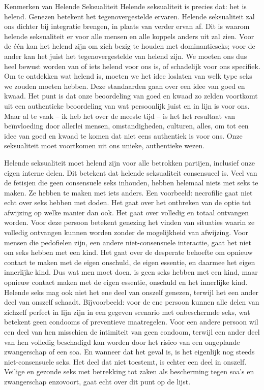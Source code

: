 Kenmerken van Helende Seksualiteit
Helende seksualiteit is precies dat: het is helend. Genezen betekent het tegenovergestelde ervaren. Helende seksualiteit zal ons dichter bij integratie brengen, in plaats van verder ervan af. Dit is waarom helende seksualiteit er voor alle mensen en alle koppels anders uit zal zien. Voor de één kan het helend zijn om zich bezig te houden met dominantieseks; voor de ander kan het juist het tegenovergestelde van helend zijn. We moeten ons dus heel bewust worden van of iets helend voor ons is, of schadelijk voor ons specifiek. Om te ontdekken wat helend is, moeten we het idee loslaten van welk type seks we zouden moeten hebben. Deze standaarden gaan over een idee van goed en kwaad. Het punt is dat onze beoordeling van goed en kwaad zo zelden voortkomt uit een authentieke beoordeling van wat persoonlijk juist en in lijn is voor ons. Maar al te vaak – ik heb het over de meeste tijd – is het het resultaat van beïnvloeding door allerlei mensen, omstandigheden, culturen, alles, om tot een idee van goed en kwaad te komen dat niet eens authentiek is voor ons. Onze seksualiteit moet voortkomen uit ons unieke, authentieke wezen.

Helende seksualiteit moet helend zijn voor alle betrokken partijen, inclusief onze eigen interne delen. Dit betekent dat helende seksualiteit consensueel is. Veel van de fetisjen die geen consensuele seks inhouden, hebben helemaal niets met seks te maken. Ze hebben te maken met iets anders. Een voorbeeld: necrofilie gaat niet echt over seks hebben met doden. Het gaat over het ontbreken van de optie tot afwijzing op welke manier dan ook. Het gaat over volledig en totaal ontvangen worden. Voor deze persoon betekent genezing het vinden van situaties waarin ze volledig ontvangen kunnen worden zonder de mogelijkheid van afwijzing. Voor mensen die pedofielen zijn, een andere niet-consensuele interactie, gaat het niet om seks hebben met een kind. Het gaat over de desperate behoefte om opnieuw contact te maken met de eigen onschuld, de eigen essentie, en daarmee het eigen innerlijke kind. Dus wat men moet doen, is geen seks hebben met een kind, maar opnieuw contact maken met de eigen essentie, onschuld en het innerlijke kind. Helende seks mag ook niet het ene deel van onszelf genezen, terwijl het een ander deel van onszelf schaadt. Bijvoorbeeld: voor de ene persoon kunnen alle delen van zichzelf perfect in lijn zijn in een gegeven scenario met onbeschermde seks, wat betekent geen condooms of preventieve maatregelen. Voor een andere persoon wil een deel van hen misschien de intimiteit van geen condoom, terwijl een ander deel van hen volledig beschadigd kan worden door het risico van een ongeplande zwangerschap of een soa. En wanneer dat het geval is, is het eigenlijk nog steeds niet-consensuele seks. Het deel dat niet toestemt, is echter een deel in onszelf. Veilige en gezonde seks met betrekking tot zaken als bescherming tegen soa's en zwangerschap enzovoort, gaat echt over dit punt op de lijst.

